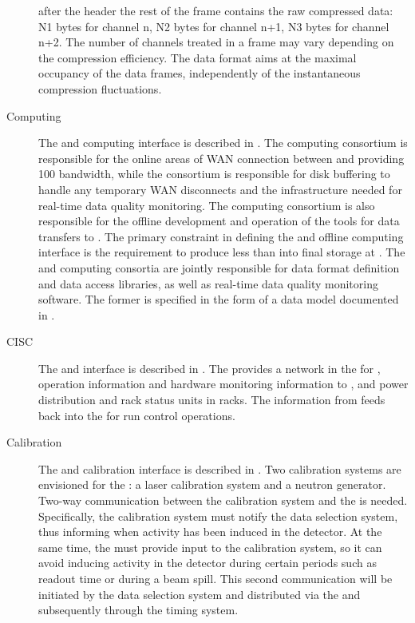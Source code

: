 \begin{description}
after the header the rest of the frame contains the raw compressed data:  N1 bytes for channel n,  N2 bytes for channel n+1, N3 bytes for channel n+2.  The number of channels treated in a frame may vary depending on the compression efficiency. The data format aims at the maximal  occupancy of the data frames, independently of the instantaneous compression fluctuations.

\item[Computing] The  and computing interface is described in .
 The computing consortium
 is responsible for the online areas of WAN connection between  and
\fnal providing \SI{100}{\Gbps} bandwidth, while the  consortium is responsible for disk buffering
to handle any temporary WAN disconnects and the infrastructure needed
for real-time data quality monitoring.  The computing consortium 
is also
responsible for the offline development and operation of the tools for data
transfers to \fnal. The primary
constraint in defining the  and offline computing interface is the
requirement to produce less than \offsitepbpy 
into final storage at
\fnal. The  and
computing consortia are jointly responsible for data
format definition and data access libraries, as well as real-time data
quality monitoring software. The former is specified in the form of a 
data model documented in .

\item[CISC] The  and  interface is described in
. The  provides a network in the  for ,  operation information and hardware
monitoring information to , and power distribution and
rack status units in  racks. The information from 
feeds back into the  for run control operations.

\item[Calibration] The  and calibration interface is described in . 
Two calibration systems are envisioned for the : a laser calibration system and a neutron generator. 
  Two-way communication between the calibration system and the
   is needed.  Specifically, the calibration system must
  notify the data selection system, thus informing 
  when activity has been induced in the detector. At the same time, 
the  must provide input to the calibration system, so it can avoid inducing activity in 
the detector during certain periods such as  readout time or during a beam spill.
This second communication will be initiated by the data selection
system and distributed via the  and
subsequently through the
 timing system.


\end{description}
